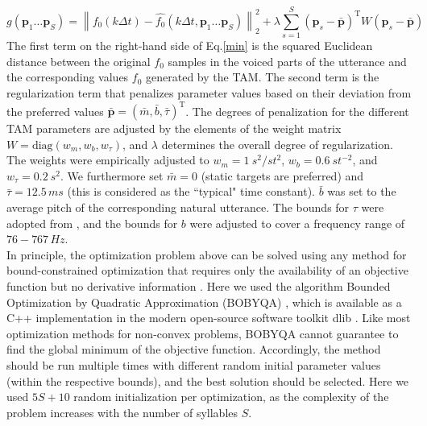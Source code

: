 \begin{equation}\label{min}
\mathit{g}(\mathbf{p}_{1}\dots \mathbf{p}_{S})=\left \| f_{0}(k\Delta t)-\hat{f_{0}}(k\Delta t,\mathbf{p}_{1}\dots \mathbf{p}_{S}) \right \|_{2}^{2}+\lambda \sum_{s=1}^{S}(\mathbf{p}_{s}-\mathbf{\bar{p}})^{\mathrm{T}}W(\mathbf{p}_{s}-\mathbf{\bar{p}})
\end{equation}
The first term on the right-hand side of Eq.\ref{min} is the squared Euclidean distance between the original $f_{0}$ samples in the voiced parts of the utterance and the corresponding values $f_{0}$ generated by the TAM. The second term is the regularization term that penalizes parameter values based on their deviation from the preferred values $\mathbf{\bar{p}}=(\bar{m},\bar{b},\bar{\tau})^\mathrm{T}$. The degrees of penalization for the different TAM parameters are adjusted by the elements of the weight matrix $W=\mathrm{diag}(w_{m},w_{b},w_{\tau})$, and $\lambda$ determines the overall degree of regularization. The weights were empirically adjusted to $w_{m}=1\: s^{2}/st^{2}$, $w_{b}=0.6\: st^{-2}$, and $w_{\tau}=0.2\: s^{2}$. We furthermore set $\bar{m}=0$ (static targets are preferred) and $\bar{\tau}=12.5\,ms$ (this is considered as the ``typical" time constant). $\bar{b}$ was set to the average pitch of the corresponding natural utterance. The bounds for $\tau$ were adopted from \cite{TAM2}, and the bounds for $b$ were adjusted to cover a frequency range of $76-767\,Hz$.\\
In principle, the optimization problem above can be solved using any method for bound-constrained optimization that requires only the availability of an objective function but no derivative information \cite{DFO}. Here we used the algorithm Bounded Optimization by Quadratic Approximation (BOBYQA) \cite{BBQ}, which is available as a C++ implementation in the modern open-source software toolkit dlib \cite{Dlib}. Like most optimization methods for non-convex problems, BOBYQA cannot guarantee to find the global minimum of the objective function. Accordingly, the method should be run multiple times with different random initial parameter values (within the respective bounds), and the best solution should be selected. Here we used $5S+10$ random initialization per optimization, as the complexity of the problem increases with the number of syllables $S$.

